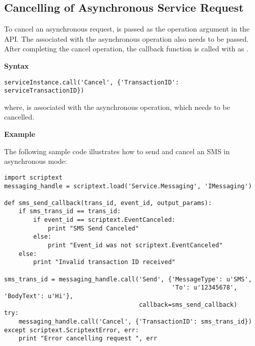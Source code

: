 \subsection{Cancelling of Asynchronous Service Request}
\label{subsec:pycancelasyncservice}

To cancel an asynchronous request,  is passed as the operation argument in the  API. The  associated with the asynchronous operation also needs to be passed. After completing the cancel operation, the callback function is called with  as .

{\bf Syntax} \break

\begin{verbatim}
serviceInstance.call('Cancel', {'TransactionID': serviceTransactionID})
\end{verbatim}

where,  is associated with the asynchronous operation, which needs to be cancelled.

{\bf Example} \break

The following sample code illustrates how to send and cancel an SMS in asynchronous mode:

\begin{verbatim}
import scriptext
messaging_handle = scriptext.load('Service.Messaging', 'IMessaging')

def sms_send_callback(trans_id, event_id, output_params):
    if sms_trans_id == trans_id:
        if event_id == scriptext.EventCanceled:
            print "SMS Send Canceled"
        else:
            print "Event_id was not scriptext.EventCanceled"
    else:
        print "Invalid transaction ID received"

sms_trans_id = messaging_handle.call('Send', {'MessageType': u'SMS', 
                                              'To': u'12345678', 'BodyText': u'Hi'}, 
                                     callback=sms_send_callback)
try:
    messaging_handle.call('Cancel', {'TransactionID': sms_trans_id})
except scriptext.ScriptextError, err:
    print "Error cancelling request ", err
\end{verbatim}

\pagebreak


